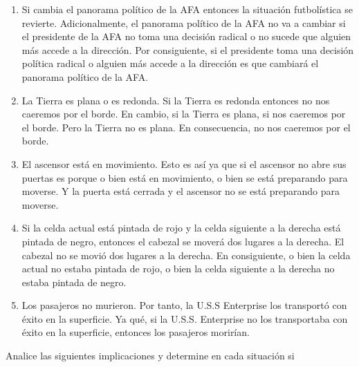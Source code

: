 \begin{exercise}
\begin{enumerate}[a]
        \item Si cambia el panorama político de la AFA entonces la situación
        futbolística se revierte. Adicionalmente, el panorama político de la AFA
        no va a cambiar si el presidente de la AFA no toma una decisión radical
        o no sucede que alguien más accede a la dirección. Por consiguiente, si
        el presidente toma una decisión política radical o alguien más accede a
        la dirección es que cambiará el panorama político de la AFA.

        \item La Tierra es plana o es redonda. Si la Tierra es redonda entonces
        no nos caeremos por el borde. En cambio, si la Tierra es plana, si nos
        caeremos por el borde. Pero la Tierra no es plana. En consecuencia, no
        nos caeremos por el borde.

        \item El ascensor está en movimiento. Esto es así ya que si el ascensor
        no abre sus puertas es porque o bien está en movimiento, o bien se está
        preparando para moverse. Y la puerta está cerrada y el ascensor no se
        está preparando para moverse.

        \item Si la celda actual está pintada de rojo y la celda siguiente a la
        derecha está pintada de negro, entonces el cabezal se moverá dos lugares
        a la derecha. El cabezal no se movió dos lugares a la derecha. En
        consiguiente, o bien la celda actual no estaba pintada de rojo, o bien
        la celda siguiente a la derecha no estaba pintada de negro.

        \item Los pasajeros no murieron. Por tanto, la U.S.S Enterprise los
        transportó con éxito en la superficie. Ya qué, si la U.S.S. Enterprise
        no los transportaba con éxito en la superficie, entonces los pasajeros
        morirían.

    \end{enumerate}
\end{exercise}

\begin{exercise}
    Analice las siguientes implicaciones y determine en cada situación si
\end{exercise}

